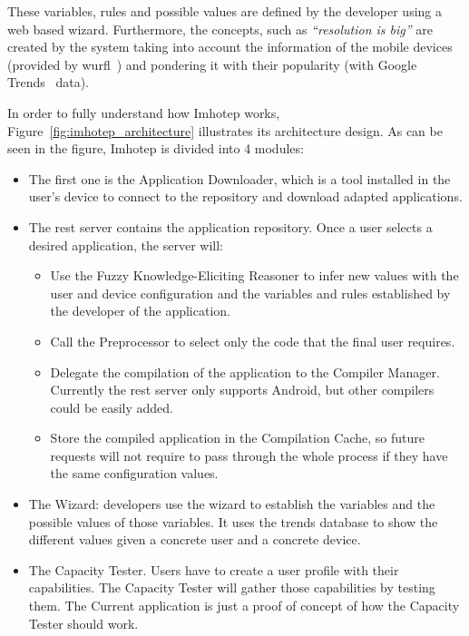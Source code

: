 These variables, rules and possible values are defined by the developer using a
web based wizard. Furthermore, the concepts, such as \textit{``resolution is 
big''}
are created by the system taking into account the information of the mobile
devices (provided by \ac{wurfl}~\citep{wurfl}) and pondering it with their popularity
(with Google Trends~\citep{trends} data).

In order to fully understand how Imhotep works, 
Figure~\ref{fig:imhotep_architecture}
illustrates its architecture design. As can be seen in the figure, Imhotep is
divided into 4 modules:

\begin{itemize}
    \item The first one is the Application Downloader, which is a tool installed
    in the user's device to connect to the repository and download adapted
    applications.
    
    \item The \ac{rest} server contains the application repository. Once a user 
    selects a desired application, the server will:
    
    \begin{itemize}
      \item Use the Fuzzy Knowledge-Eliciting Reasoner to infer new values with
      the user and device configuration and the variables and rules established
      by the developer of the application.
      
      \item Call the Preprocessor to select only the code that the final user
      requires.
      
      \item Delegate the compilation of the application to the Compiler Manager.
      Currently the \ac{rest} server only supports Android, but other compilers could
      be easily added.
      
      \item Store the compiled application in the Compilation Cache, so future
      requests will not require to pass through the whole process if they have
      the same configuration values.
    \end{itemize}
    
  \item The Wizard: developers use the wizard to establish the variables and the
  possible values of those variables. It uses the trends database to show the
  different values given a concrete user and a concrete device.
  
  \item The Capacity Tester. Users have to create a user profile with their
  capabilities. The Capacity Tester will gather those capabilities by testing
  them. The Current application is just a proof of concept of how the Capacity
  Tester should work.
\end{itemize}

